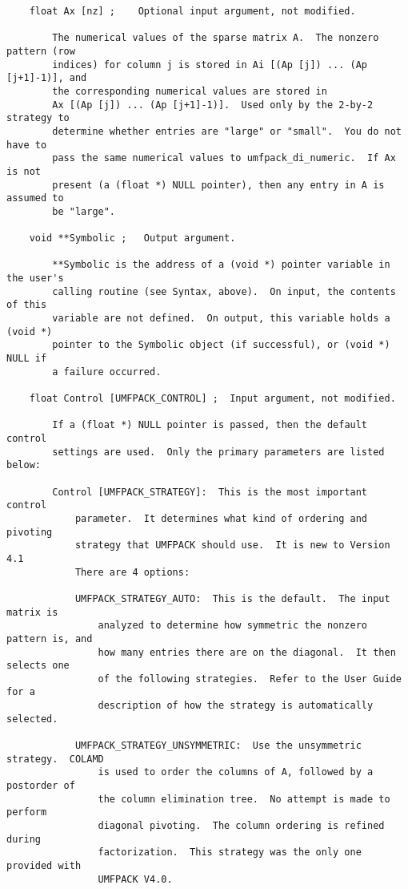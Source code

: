 \documentclass[11pt]{article}
\begin{document}
{\begin{verbatim}
    float Ax [nz] ;    Optional input argument, not modified.

        The numerical values of the sparse matrix A.  The nonzero pattern (row
        indices) for column j is stored in Ai [(Ap [j]) ... (Ap [j+1]-1)], and
        the corresponding numerical values are stored in
        Ax [(Ap [j]) ... (Ap [j+1]-1)].  Used only by the 2-by-2 strategy to
        determine whether entries are "large" or "small".  You do not have to
        pass the same numerical values to umfpack_di_numeric.  If Ax is not
        present (a (float *) NULL pointer), then any entry in A is assumed to
        be "large".

    void **Symbolic ;   Output argument.

        **Symbolic is the address of a (void *) pointer variable in the user's
        calling routine (see Syntax, above).  On input, the contents of this
        variable are not defined.  On output, this variable holds a (void *)
        pointer to the Symbolic object (if successful), or (void *) NULL if
        a failure occurred.

    float Control [UMFPACK_CONTROL] ;  Input argument, not modified.

        If a (float *) NULL pointer is passed, then the default control
        settings are used.  Only the primary parameters are listed below:

        Control [UMFPACK_STRATEGY]:  This is the most important control
            parameter.  It determines what kind of ordering and pivoting
            strategy that UMFPACK should use.  It is new to Version 4.1
            There are 4 options:

            UMFPACK_STRATEGY_AUTO:  This is the default.  The input matrix is
                analyzed to determine how symmetric the nonzero pattern is, and
                how many entries there are on the diagonal.  It then selects one
                of the following strategies.  Refer to the User Guide for a
                description of how the strategy is automatically selected.

            UMFPACK_STRATEGY_UNSYMMETRIC:  Use the unsymmetric strategy.  COLAMD
                is used to order the columns of A, followed by a postorder of
                the column elimination tree.  No attempt is made to perform
                diagonal pivoting.  The column ordering is refined during
                factorization.  This strategy was the only one provided with
                UMFPACK V4.0.


\end{verbatim}}
\end{document}
